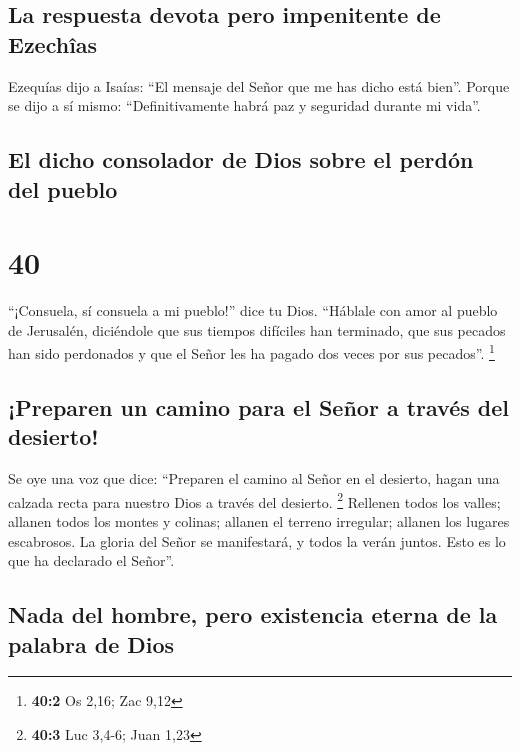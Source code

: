 \hypertarget{la-respuesta-devota-pero-impenitente-de-ezechuxeeas}{%
\subsection{La respuesta devota pero impenitente de
Ezechîas}\label{la-respuesta-devota-pero-impenitente-de-ezechuxeeas}}

 Ezequías dijo a Isaías: ``El mensaje del Señor que me has
dicho está bien''. Porque se dijo a sí mismo: ``Definitivamente habrá
paz y seguridad durante mi vida''.

\hypertarget{el-dicho-consolador-de-dios-sobre-el-perduxf3n-del-pueblo}{%
\subsection{El dicho consolador de Dios sobre el perdón del
pueblo}\label{el-dicho-consolador-de-dios-sobre-el-perduxf3n-del-pueblo}}

\hypertarget{section-39}{%
\section{40}\label{section-39}}

 ``¡Consuela, sí consuela a mi pueblo!'' dice tu Dios.
 ``Háblale con amor al pueblo de Jerusalén, diciéndole que
sus tiempos difíciles han terminado, que sus pecados han sido perdonados
y que el Señor les ha pagado dos veces por sus pecados''. \footnote{\textbf{40:2}
  Os 2,16; Zac 9,12}

\hypertarget{preparen-un-camino-para-el-seuxf1or-a-travuxe9s-del-desierto}{%
\subsection{¡Preparen un camino para el Señor a través del
desierto!}\label{preparen-un-camino-para-el-seuxf1or-a-travuxe9s-del-desierto}}

 Se oye una voz que dice: ``Preparen el camino al Señor en
el desierto, hagan una calzada recta para nuestro Dios a través del
desierto. \footnote{\textbf{40:3} Luc 3,4-6; Juan 1,23} 
Rellenen todos los valles; allanen todos los montes y colinas; allanen
el terreno irregular; allanen los lugares escabrosos.  La
gloria del Señor se manifestará, y todos la verán juntos. Esto es lo que
ha declarado el Señor''.

\hypertarget{nada-del-hombre-pero-existencia-eterna-de-la-palabra-de-dios}{%
\subsection{Nada del hombre, pero existencia eterna de la palabra de
Dios}\label{nada-del-hombre-pero-existencia-eterna-de-la-palabra-de-dios}}

